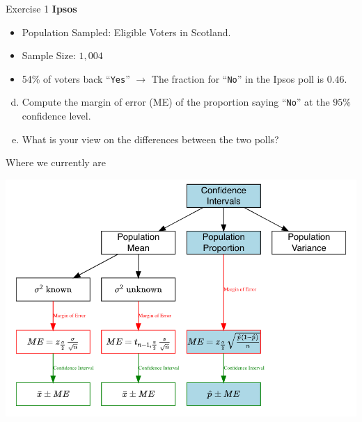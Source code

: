 \documentclass[
  11pt,
  ignorenonframetext,
]{beamer}
\providecommand{\tightlist}{%
  \setlength{\itemsep}{0pt}\setlength{\parskip}{0pt}}
\begin{document}
\begin{frame}[fragile]{Exercise 1}
\protect\hypertarget{exercise-1-1}{}
\textbf{Ipsos}

\begin{itemize}
\tightlist
\item
  Population Sampled: Eligible Voters in Scotland.
\item
  Sample Size: \(1,004\)
\item
  54\% of voters back ``\texttt{Yes}'' \(\rightarrow\) The fraction for
  ``\texttt{No}'' in the Ipsos poll is \(0.46\).
\end{itemize}

\begin{enumerate}
[(a)]
\setcounter{enumi}{3}
\tightlist
\item
  Compute the margin of error (ME) of the proportion saying
  ``\texttt{No}'' at the \(95\%\) confidence level.
\item
  What is your view on the differences between the two polls?
\end{enumerate}
\end{frame}

\begin{frame}{Where we currently are}
\protect\hypertarget{where-we-currently-are}{}
\begin{center}\includegraphics[width=0.9\linewidth]{pictures/CI_BriefReview-Ex1} \end{center}
\end{frame}
\end{document}
